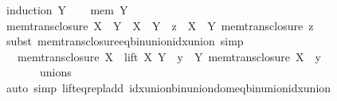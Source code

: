 \begin{isabellebody}
%
\isadelimproof
%
\endisadelimproof
%
\isatagproof
{}\isamarkupfalse%
\ {\isacharparenleft}{\kern0pt}induction\ Y{\isacharparenright}{\kern0pt}\isanewline
\ \ \isamarkupfalse%
\ {\isacharparenleft}{\kern0pt}mem\ Y{\isacharparenright}{\kern0pt}\isanewline
\ \ \isamarkupfalse%
\ {\isachardoublequoteopen}mem{\isacharunderscore}{\kern0pt}trans{\isacharunderscore}{\kern0pt}closure\ {\isacharparenleft}{\kern0pt}X\ {\isacharplus}{\kern0pt}\ Y{\isacharparenright}{\kern0pt}\ {\isacharequal}{\kern0pt}\ {\isacharparenleft}{\kern0pt}X\ {\isacharplus}{\kern0pt}\ Y{\isacharparenright}{\kern0pt}\ {\isasymunion}\ {\isacharparenleft}{\kern0pt}{\isasymUnion}z\ {\isasymin}\ X\ {\isacharplus}{\kern0pt}\ Y{\isachardot}{\kern0pt}\ mem{\isacharunderscore}{\kern0pt}trans{\isacharunderscore}{\kern0pt}closure\ z{\isacharparenright}{\kern0pt}{\isachardoublequoteclose}\isanewline
\ \ \ \ \isamarkupfalse%
\ {\isacharparenleft}{\kern0pt}subst\ mem{\isacharunderscore}{\kern0pt}trans{\isacharunderscore}{\kern0pt}closure{\isacharunderscore}{\kern0pt}eq{\isacharunderscore}{\kern0pt}bin{\isacharunderscore}{\kern0pt}union{\isacharunderscore}{\kern0pt}idx{\isacharunderscore}{\kern0pt}union{\isacharparenright}{\kern0pt}\ simp\isanewline
\ \ \isamarkupfalse%
\ \isamarkupfalse%
\ {\isachardoublequoteopen}{\isachardot}{\kern0pt}{\isachardot}{\kern0pt}{\isachardot}{\kern0pt}\ {\isacharequal}{\kern0pt}\ mem{\isacharunderscore}{\kern0pt}trans{\isacharunderscore}{\kern0pt}closure\ X\ {\isasymunion}\ lift\ X\ Y\ {\isasymunion}\ {\isacharparenleft}{\kern0pt}{\isasymUnion}y\ {\isasymin}\ Y{\isachardot}{\kern0pt}\ mem{\isacharunderscore}{\kern0pt}trans{\isacharunderscore}{\kern0pt}closure\ {\isacharparenleft}{\kern0pt}X\ {\isacharplus}{\kern0pt}\ y{\isacharparenright}{\kern0pt}{\isacharparenright}{\kern0pt}{\isachardoublequoteclose}\isanewline
\ \ \ \ {\isacharparenleft}{\kern0pt}\ {\isachardoublequoteopen}{\isacharunderscore}{\kern0pt}\ {\isacharequal}{\kern0pt}\ {\isacharquery}{\kern0pt}unions\ {\isasymunion}\ {\isacharunderscore}{\kern0pt}{\isachardoublequoteclose}{\isacharparenright}{\kern0pt}\isanewline
\ \ \ \ \isamarkupfalse%
\ {\isacharparenleft}{\kern0pt}auto\ simp{\isacharcolon}{\kern0pt}\ lift{\isacharunderscore}{\kern0pt}eq{\isacharunderscore}{\kern0pt}repl{\isacharunderscore}{\kern0pt}add\ idx{\isacharunderscore}{\kern0pt}union{\isacharunderscore}{\kern0pt}bin{\isacharunderscore}{\kern0pt}union{\isacharunderscore}{\kern0pt}dom{\isacharunderscore}{\kern0pt}eq{\isacharunderscore}{\kern0pt}bin{\isacharunderscore}{\kern0pt}union{\isacharunderscore}{\kern0pt}idx{\isacharunderscore}{\kern0pt}union\isanewline

\end{isabellebody}
